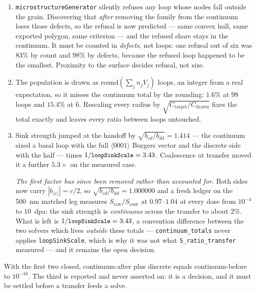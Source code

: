 \documentclass[11pt,a4paper]{article}
\newcommand{\code}[1]{\texttt{\small #1}}
\newcommand{\cloop}{\ensuremath{\langle c\rangle}}
\begin{document}
\begin{enumerate}\itemsep3pt
\item \code{microstructureGenerator} silently refuses any loop whose nodes fall
outside the grain. Discovering that \emph{after} removing the family from the
continuum loses those defects, so the refusal is now predicted --- same convex
hull, same exported polygon, same criterion --- and the refused share stays in
the continuum. It must be counted in \emph{defects}, not loops: one refusal out
of six was $83\%$ by count and $98\%$ by defects, because the refused loop
happened to be the smallest. Proximity to the surface decides refusal, not size.
\item The population is drawn as $\mathrm{round}(\sum_j n_j V_j)$ loops, an
integer from a real expectation, so it misses the continuum total by the
rounding: $1.6\%$ at $98$ loops and $15.4\%$ at $6$. Rescaling every radius by
$\sqrt{C_{\text{target}}/C_{\text{drawn}}}$ fixes the total exactly and leaves
every ratio between loops untouched.
\item Sink strength jumped at the handoff by $\sqrt{b_{cd}/b_{dd}} = 1.414$ ---
the continuum sized a basal loop with the full $\langle 0001\rangle$ Burgers
vector and the discrete side with the half --- times $1/\code{loopSinkScale} =
3.43$. Coalescence at transfer moved it a further $5.3\times$ on the measured
case.

\emph{The first factor has since been removed rather than accounted for.} Both
sides now carry $|b_{\cloop{}}| = c/2$, so $\sqrt{b_{cd}/b_{dd}} = 1.000000$ and
a fresh ledger on the 500~nm matched leg measures $S_{\text{raw}}/S_{\text{cont}}$
at $0.97$--$1.04$ at every dose from $10^{-4}$ to $10$~dpa: the sink strength is
\emph{continuous} across the transfer to about $2\%$. What is left is
$1/\code{loopSinkScale} = 3.43$, a convention difference between the two solvers
which lives \emph{outside} these totals --- \code{continuum\_totals} never
applies \code{loopSinkScale}, which is why it was not what
\code{S\_ratio\_transfer} measured --- and it remains the open decision.
\end{enumerate}

\noindent
With the first two closed, continuum-after plus discrete equals
continuum-before to $10^{-16}$. The third is reported and never asserted on: it
is a decision, and it must be settled before a transfer feeds a solve.
\end{document}
